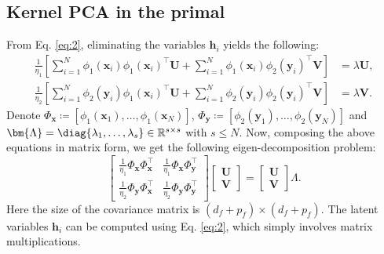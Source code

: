 \documentclass[preview,border=0.3pt]{standalone}
\begin{document}
\subsection{Kernel PCA in the primal}
\label{subsec:cov_mat}
%
From Eq. \ref{eq:2}, eliminating the variables $\bm{h}_{i}$ yields the following:
\begin{equation}
    \begin{aligned}
        \frac{1}{\eta_1}\left[ \sum_{i=1}^{N}\phi_{1}(\bm{x}_{i})\phi_{1}(\bm{x}_{i})^\top \bm{U} + \sum_{i=1}^{N}\phi_{1}(\bm{x}_{i})\phi_{2}(\bm{y}_{i})^\top \bm{V}  \right] & = \lambda\bm{U}, \\
        \frac{1}{\eta_2}\left[  \sum_{i=1}^{N}\phi_{2}(\bm{y}_{i})\phi_{1}(\bm{x}_{i})^\top \bm{U} + \sum_{i=1}^{N}\phi_{2}(\bm{y}_{i})\phi_{2}(\bm{y}_{i})^\top \bm{V} \right] & = \lambda\bm{V}.
    \end{aligned}
\end{equation}
%
Denote $\Phi_{\bm{x}}\coloneqq\left[ \phi_{1}(\bm{x}_{1}),\dots, \phi_{1}(\bm{x}_{N}) \right]$, $ \Phi_{\bm{y}}\coloneqq\left[ \phi_{2}(\bm{y}_{1}),\dots, \phi_{2}(\bm{y}_{N}) \right]$ and $ \bm{\Lambda} =\diag\{\lambda_1,\ldots,\lambda_s\}\in\mathbb{R}^{s\times s} $ with $s \leq N$. Now, composing the above equations in matrix form, we get the following eigen-decomposition problem:
%
\begin{equation}\label{eq: cov_mat_appen}
    \begin{bmatrix}
        \frac{1}{\eta_1} \Phi_{\bm{x}}\Phi_{\bm{x}}^{\top} & \frac{1}{\eta_1}\Phi_{\bm{x}}\Phi_{\bm{y}}^{\top} \\
        \frac{1}{\eta_2}\Phi_{\bm{y}}\Phi_{\bm{x}}^{\top}  & \frac{1}{\eta_2}\Phi_{\bm{y}}\Phi_{\bm{y}}^{\top}
    \end{bmatrix}
    \begin{bmatrix}
        \bm{U} \\ \bm{V}
    \end{bmatrix} =
    \begin{bmatrix}
        \bm{U} \\ \bm{V}
    \end{bmatrix}\Lambda.
\end{equation}
%
Here the size of the covariance matrix is $(d_f + p_f)\times (d_f + p_f)$. The latent variables $\bm{h}_{i}$ can be computed using Eq. \ref{eq:2}, which simply involves matrix multiplications.
%
\end{document}

